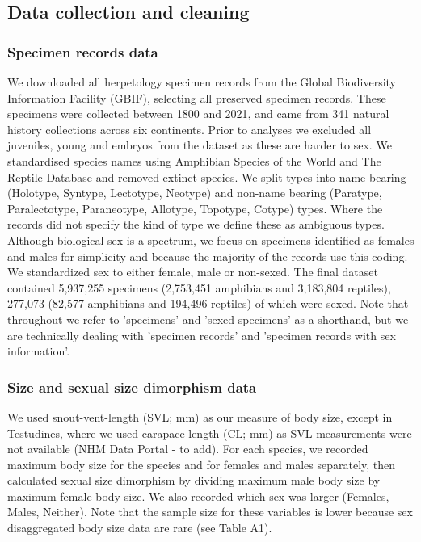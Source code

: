 \documentclass[a4paper, 12pt]{article}
\begin{document}
\subsection{Data collection and cleaning}

\subsubsection{Specimen records data}
We downloaded all herpetology specimen records from the Global Biodiversity Information Facility (GBIF\cite{gbif-amphibians,gbif-reptiles}), selecting all preserved specimen records. 
These specimens were collected between 1800 and 2021, and came from 341 natural history collections across six continents. 
Prior to analyses we excluded all juveniles, young and embryos from the dataset as these are harder to sex. 
We standardised species names using Amphibian Species of the World\cite{frost2021} and The Reptile Database\cite{uetz2021} and removed extinct species. 
We split types into name bearing (Holotype, Syntype, Lectotype, Neotype) and non-name bearing (Paratype, Paralectotype, Paraneotype, Allotype, Topotype, Cotype) types\cite{schuchert1897type}. 
Where the records did not specify the kind of type we define these as ambiguous types. 
Although biological sex is a spectrum\cite{sciam2017}, we focus on specimens identified as females and males for simplicity and because the majority of the records use this coding. 
We standardized sex to either female, male or non-sexed. 
The final dataset contained 5,937,255 specimens (2,753,451 amphibians and 3,183,804 reptiles), 277,073 (82,577 amphibians and 194,496 reptiles) of which were sexed. Note that throughout we refer to 'specimens' and 'sexed specimens' as a shorthand, but we are technically dealing with 'specimen records' and 'specimen records with sex information'. 

\subsubsection{Size and sexual size dimorphism data}
We used snout-vent-length (SVL; mm) as our measure of body size, except in Testudines, where we used carapace length (CL; mm) as SVL measurements were not available (NHM Data Portal - to add). 
For each species, we recorded maximum body size for the species and for females and males separately, then calculated sexual size dimorphism by dividing maximum male body size by maximum female body size. 
We also recorded which sex was larger (Females, Males, Neither). 
Note that the sample size for these variables is lower because sex disaggregated body size data are rare (see Table A1). 
\end{document}
